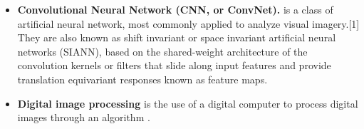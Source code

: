\begin{refsection}
\begin{itemize}
    \item \textbf{Convolutional Neural Network (CNN, or ConvNet).} is a class of artificial neural network, most commonly applied to analyze visual imagery.[1] They are also known as shift invariant or space invariant artificial neural networks (SIANN), based on the shared-weight architecture of the convolution kernels or filters that slide along input features and provide translation equivariant responses known as feature maps.
    \item \textbf{Digital image processing} is the use of a digital computer to process digital images through an algorithm \cite{CitekeyUnpublished}. 
\end{itemize}

\clearpage

\printbibliography[heading=subbibintoc, title={\centering Notes}]
\end{refsection}